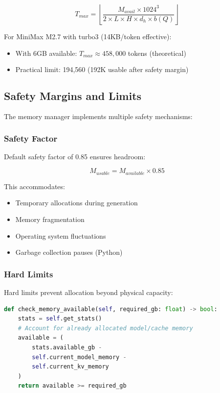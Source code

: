 \begin{equation}
T_{max} = \left\lfloor \frac{M_{avail} \times 1024^3}{2 \times L \times H \times d_h \times b(Q)} \right\rfloor
\end{equation}

For MiniMax M2.7 with turbo3 (14KB/token effective):

\begin{itemize}
    \item With 6GB available: $T_{max} \approx 458,000$ tokens (theoretical)
    \item Practical limit: 194,560 (192K usable after safety margin)
\end{itemize}

\subsection{Safety Margins and Limits}

The memory manager implements multiple safety mechanisms:

\subsubsection{Safety Factor}

Default safety factor of 0.85 ensures headroom:

\begin{equation}
M_{usable} = M_{available} \times 0.85
\end{equation}

This accommodates:
\begin{itemize}
    \item Temporary allocations during generation
    \item Memory fragmentation
    \item Operating system fluctuations
    \item Garbage collection pauses (Python)
\end{itemize}

\subsubsection{Hard Limits}

Hard limits prevent allocation beyond physical capacity:

\begin{lstlisting}[language=Python, caption=Memory Limit Enforcement]
def check_memory_available(self, required_gb: float) -> bool:
    stats = self.get_stats()
    # Account for already allocated model/cache memory
    available = (
        stats.available_gb - 
        self.current_model_memory - 
        self.current_kv_memory
    )
    return available >= required_gb
\end{lstlisting}

